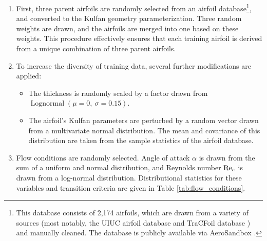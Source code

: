 \documentclass[journal]{new-aiaa}
\begin{document}
\begin{enumerate}
    \item First, three parent airfoils are randomly selected from an airfoil database\footnote{This database consists of 2,174 airfoils, which are drawn from a variety of sources (most notably, the UIUC airfoil database \cite{uiuc_airfoil_database} and TraCFoil database \cite{etiembleTraCFoilFreePack2023}) and manually cleaned. The database is publicly available via AeroSandbox \cite{sharpeAeroSandboxDifferentiableFramework2021}.}, and converted to the Kulfan geometry parameterization. Three random weights are drawn, and the airfoils are merged into one based on these weights. This procedure effectively ensures that each training airfoil is derived from a unique combination of three parent airfoils.
    \item To increase the diversity of training data, several further modifications are applied:
          \begin{itemize}
              \item The thickness is randomly scaled by a factor drawn from $\operatorname{Lognormal}(\mu=0,\ \sigma=0.15)$.
              \item The airfoil's Kulfan parameters are perturbed by a random vector drawn from a multivariate normal distribution. The mean and covariance of this distribution are taken from the sample statistics of the airfoil database.
          \end{itemize}
    \item Flow conditions are randomly selected. Angle of attack $\alpha$ is drawn from the sum of a uniform and normal distribution, and Reynolds number $\rm Re_c$ is drawn from a log-normal distribution. Distributional statistics for these variables and transition criteria are given in Table \ref{tab:flow_conditions}.
\end{enumerate}
\end{document}
